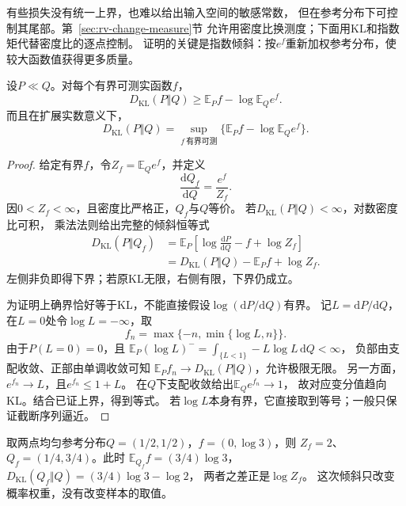有些损失没有统一上界，也难以给出输入空间的敏感常数，
但在参考分布下可控制其尾部。第~\ref{sec:rv-change-measure}节
允许用密度比换测度；下面用KL和指数矩代替密度比的逐点控制。
证明的关键是指数倾斜：按\(e^f\)重新加权参考分布，使较大函数值获得更多质量。

\begin{theorem}
\label{thm:information-donsker-varadhan}
设\(P\ll Q\)。对每个有界可测实函数\(f\)，
\begin{equation}
  D_{\mathrm{KL}}(P\Vert Q)
  \geq\mathbb E_Pf-\log\mathbb E_Qe^f.
  \label{eq:information-dv-lower}
\end{equation}
而且在扩展实数意义下，
\begin{equation}
  D_{\mathrm{KL}}(P\Vert Q)
  =\sup_{f\ \text{有界可测}}\{\mathbb E_Pf-\log\mathbb E_Qe^f\}.
  \label{eq:information-dv-variational}
\end{equation}
\end{theorem}
\begin{proof}
给定有界\(f\)，令\(Z_f=\mathbb E_Qe^f\)，并定义
\[
  \frac{\mathrm dQ_f}{\mathrm dQ}=\frac{e^f}{Z_f}.
\]
因\(0<Z_f<\infty\)，且密度比严格正，\(Q_f\)与\(Q\)等价。
若\(D_{\mathrm{KL}}(P\Vert Q)<\infty\)，对数密度比可积，
乘法法则给出完整的倾斜恒等式
\[
\begin{aligned}
  D_{\mathrm{KL}}(P\Vert Q_f)
  &=\mathbb E_P\left[\log\frac{\mathrm dP}{\mathrm dQ}-f+\log Z_f\right]\\
  &=D_{\mathrm{KL}}(P\Vert Q)-\mathbb E_Pf+\log Z_f.
\end{aligned}
\]
左侧非负即得下界；若原KL无限，右侧有限，下界仍成立。

为证明上确界恰好等于KL，不能直接假设\(\log(\mathrm dP/\mathrm dQ)\)有界。
记\(L=\mathrm dP/\mathrm dQ\)，在\(L=0\)处令\(\log L=-\infty\)，取
\[
  f_n=\max\{-n,\min\{\log L,n\}\}.
\]
由于\(P(L=0)=0\)，且
\(\mathbb E_P(\log L)^-=\int_{\{L<1\}}-L\log L\,\mathrm dQ<\infty\)，
负部由支配收敛、正部由单调收敛可知
\(\mathbb E_Pf_n\to D_{\mathrm{KL}}(P\Vert Q)\)，允许极限无限。
另一方面，\(e^{f_n}\to L\)，且\(e^{f_n}\leq1+L\)。
在\(Q\)下支配收敛给出\(\mathbb E_Qe^{f_n}\to1\)，
故对应变分值趋向KL。结合已证上界，得到等式。
若\(\log L\)本身有界，它直接取到等号；一般只保证截断序列逼近。
\end{proof}

取两点均匀参考分布\(Q=(1/2,1/2)\)，\(f=(0,\log3)\)，则
\(Z_f=2\)、\(Q_f=(1/4,3/4)\)。此时
\(\mathbb E_{Q_f}f=(3/4)\log3\)，
\(D_{\mathrm{KL}}(Q_f\Vert Q)=(3/4)\log3-\log2\)，
两者之差正是\(\log Z_f\)。
这次倾斜只改变概率权重，没有改变样本的取值。

